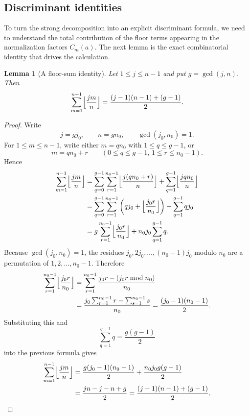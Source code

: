 \documentclass[11pt,letterpaper]{amsart}
\theoremstyle{plain}
\newtheorem{lemma}[theorem]{Lemma}
\theoremstyle{definition}
\begin{document}
\subsection{Discriminant identities}

To turn the strong decomposition into an explicit discriminant formula, we need to understand the total contribution of the floor terms appearing in the normalization factors \(C_m(a)\). The next lemma is the exact combinatorial identity that drives the calculation.


\begin{lemma}[A floor-sum identity]\label{lem:floor-sum-exact}
Let $1\le j\le n-1$ and put $g=\gcd(j,n)$.
Then
\[
\sum_{m=1}^{n-1}\Bigl\lfloor\frac{jm}{n}\Bigr\rfloor
=\frac{(j-1)(n-1)+(g-1)}{2}.
\]
\end{lemma}

\begin{proof}
Write
\[
j=gj_0,
\qquad
n=gn_0,
\qquad
\gcd(j_0,n_0)=1.
\]
For $1\le m\le n-1$, write either $m=qn_0$ with $1\le q\le g-1$, or
\[
m=qn_0+r
\qquad
(0\le q\le g-1,\,1\le r\le n_0-1).
\]
Hence
\begin{align*}
\sum_{m=1}^{n-1}\Bigl\lfloor\frac{jm}{n}\Bigr\rfloor
&=\sum_{q=0}^{g-1}\sum_{r=1}^{n_0-1}\Bigl\lfloor\frac{j(qn_0+r)}{n}\Bigr\rfloor
   +\sum_{q=1}^{g-1}\Bigl\lfloor\frac{jqn_0}{n}\Bigr\rfloor \\
&=\sum_{q=0}^{g-1}\sum_{r=1}^{n_0-1}\left(qj_0+\Bigl\lfloor\frac{j_0r}{n_0}\Bigr\rfloor\right)
   +\sum_{q=1}^{g-1} qj_0 \\
&=g\sum_{r=1}^{n_0-1}\Bigl\lfloor\frac{j_0r}{n_0}\Bigr\rfloor
  +n_0j_0\sum_{q=1}^{g-1} q.
\end{align*}
Because $\gcd(j_0,n_0)=1$, the residues $j_0,2j_0,\dots,(n_0-1)j_0$ modulo $n_0$ are a permutation of
$1,2,\dots,n_0-1$.
Therefore
\begin{align*}
\sum_{r=1}^{n_0-1}\Bigl\lfloor\frac{j_0r}{n_0}\Bigr\rfloor
&=\sum_{r=1}^{n_0-1}\frac{j_0r-(j_0r\bmod n_0)}{n_0} \\
&=\frac{j_0\sum_{r=1}^{n_0-1} r-\sum_{s=1}^{n_0-1} s}{n_0}
=\frac{(j_0-1)(n_0-1)}{2}.
\end{align*}
Substituting this and
\[
\sum_{q=1}^{g-1}q=\frac{g(g-1)}{2}
\]
into the previous formula gives
\begin{align*}
\sum_{m=1}^{n-1}\Bigl\lfloor\frac{jm}{n}\Bigr\rfloor
&=\frac{g(j_0-1)(n_0-1)}{2}+\frac{n_0j_0g(g-1)}{2} \\
&=\frac{jn-j-n+g}{2}
=\frac{(j-1)(n-1)+(g-1)}{2}.
\end{align*}
\end{proof}
\end{document}

